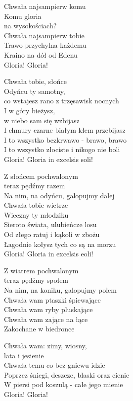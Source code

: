 \begin{text}
    Chwała najsampierw komu\\
    Komu gloria\\
    na wysokościach?\\
    Chwała najsampierw tobie\\
    Trawo przychylna każdemu\\
    Kraino na dół od Edenu\\
    Gloria! Gloria!

    Chwała tobie, słońce\\
    Odyńcu ty samotny,\\
    co wstajesz rano z trzęsawisk nocnych\\
    I w góry bieżysz,\\
    w niebo sam się wzbijasz\\
    I chmury czarne białym kłem przebijasz\\
    I to wszystko bezkrwawo - brawo, brawo\\
    I to wszystko złociste i nikogo nie boli\\
    Gloria! Gloria in excelsis soli!

    Z słońcem pochwalonym\\
    teraz pędźmy razem\\
    Na nim, na odyńcu, galopujmy dalej\\
    Chwała tobie wietrze\\
    Wieczny ty młodziku\\
    Sieroto świata, ulubieńcze losu\\
    Od złego ratuj i kąkoli w zbożu\\
    Łagodnie kołysz tych co są na morzu\\
    Gloria! Gloria in excelsis eoli!

    Z wiatrem pochwalonym\\
    teraz pędźmy społem\\
    Na nim, na koniku, galopujmy polem\\
    Chwała wam ptaszki śpiewające\\
    Chwała wam ryby pluskające\\
    Chwała wam zające na łące\\
    Zakochane w biedronce

    Chwała wam: zimy, wiosny,\\
    lata i jesienie\\
    Chwała temu co bez gniewu idzie\\
    Poprzez śniegi, deszcze, blaski oraz cienie\\
    W piersi pod koszulą - całe jego mienie\\
    Gloria! Gloria!
\end{text}
